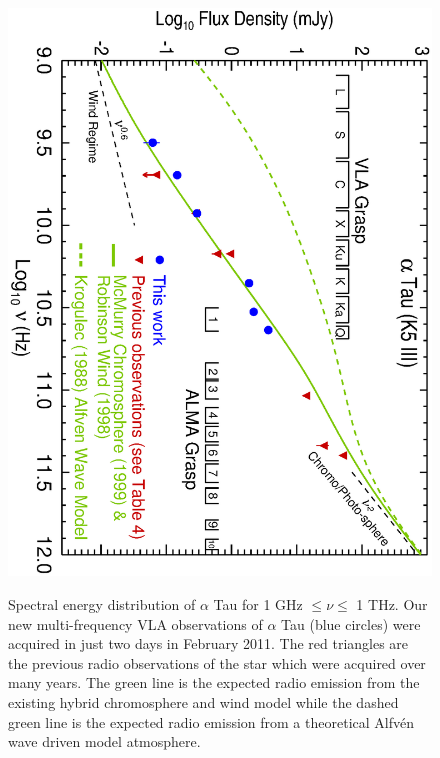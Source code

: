 \documentclass[iop]{emulateapj}
\begin{document}
\begin{figure}
\includegraphics[trim = 0mm 0mm 0mm 20mm, clip,scale=0.65, angle=90]{fig2.ps}
\\
\caption{Spectral energy distribution of $\alpha$ Tau for 1 GHz $\leq \nu \leq$ 1 THz. Our new multi-frequency VLA observations of $\alpha$ Tau (blue circles) were acquired in just two days in February 2011. The red triangles are the previous radio observations of the star which were acquired over many years. The green line is the expected radio emission from the existing hybrid chromosphere and wind model while the dashed  green line is the expected radio emission from a theoretical Alfv\'en wave driven model atmosphere.}
\label{fig:fig2}
\end{figure}
\end{document}
